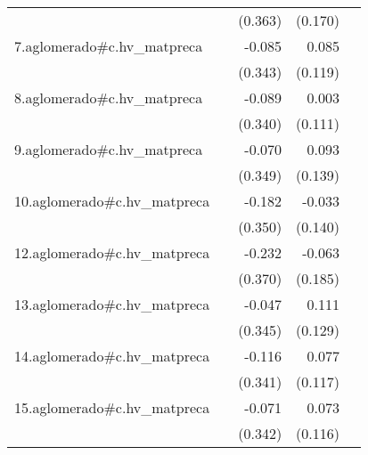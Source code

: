 {\begin{longtable}{l*{4}{D{.}{.}{-1}}}
            &                     &     (0.363)         &     (0.170)         &                     \\
\addlinespace
7.aglomerado#c.hv\_matpreca&                     &      -0.085         &       0.085         &                     \\
            &                     &     (0.343)         &     (0.119)         &                     \\
\addlinespace
8.aglomerado#c.hv\_matpreca&                     &      -0.089         &       0.003         &                     \\
            &                     &     (0.340)         &     (0.111)         &                     \\
\addlinespace
9.aglomerado#c.hv\_matpreca&                     &      -0.070         &       0.093         &                     \\
            &                     &     (0.349)         &     (0.139)         &                     \\
\addlinespace
10.aglomerado#c.hv\_matpreca&                     &      -0.182         &      -0.033         &                     \\
            &                     &     (0.350)         &     (0.140)         &                     \\
\addlinespace
12.aglomerado#c.hv\_matpreca&                     &      -0.232         &      -0.063         &                     \\
            &                     &     (0.370)         &     (0.185)         &                     \\
\addlinespace
13.aglomerado#c.hv\_matpreca&                     &      -0.047         &       0.111         &                     \\
            &                     &     (0.345)         &     (0.129)         &                     \\
\addlinespace
14.aglomerado#c.hv\_matpreca&                     &      -0.116         &       0.077         &                     \\
            &                     &     (0.341)         &     (0.117)         &                     \\
\addlinespace
15.aglomerado#c.hv\_matpreca&                     &      -0.071         &       0.073         &                     \\
            &                     &     (0.342)         &     (0.116)         &                     \\

\end{longtable}}
